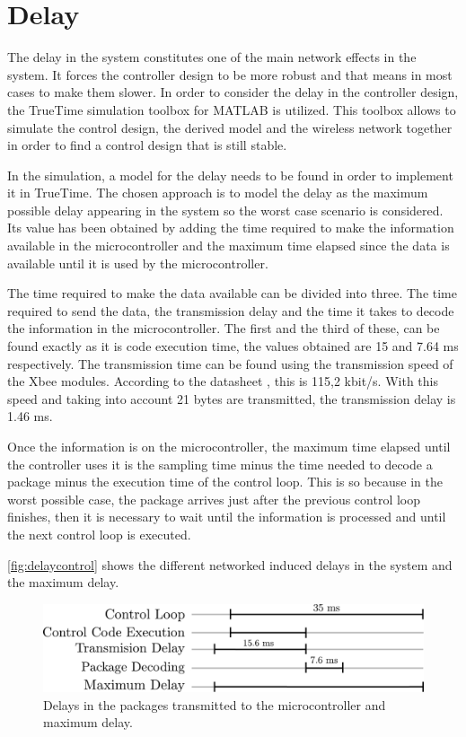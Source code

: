 \section{Delay}
The delay in the system constitutes one of the main network effects in the system. It forces the controller design to be more robust and that means in most cases to make them slower. In order to consider the delay in the controller design, the TrueTime simulation toolbox for MATLAB is utilized. This toolbox allows to simulate the control design, the derived model and the wireless network together in order to find a control design that is still stable.

In the simulation, a model for the delay needs to be found in order to implement it in TrueTime. The chosen approach is to model the delay as the maximum possible delay appearing in the system so the worst case scenario is considered. Its value has been obtained by adding the time required to make the information available in the microcontroller and the maximum time elapsed since the data is available until it is used by the microcontroller. 

The time required to make the data available can be divided into three. The time required to send the data, the transmission delay and the time it takes to decode the information in the microcontroller. The first and the third of these, can be found exactly as it is code execution time, the values obtained are 15 and 7.64 ms respectively. The transmission time can be found using the transmission speed of the Xbee modules. According to the datasheet , this is  115,2 kbit/s. With this speed and taking into account 21 bytes are transmitted, the transmission delay is 1.46 ms.

Once the information is on the microcontroller, the maximum time elapsed until the controller uses it is the sampling time minus the time needed to decode a package minus the execution time of the control loop. This is so because in the worst possible case, the package arrives just after the previous control loop finishes, then it is necessary to wait until the information is processed and until the next control loop is executed. 

\autoref{fig:delaycontrol} shows the different networked induced delays in the system and the maximum delay. 
\begin{figure}[H]
	\centering
	\includegraphics[width=.6\textwidth]{figures/maxDelay.pdf}
	\caption{Delays in the packages transmitted to the microcontroller and maximum delay.}
	\label{fig:delaycontrol}
\end{figure}

